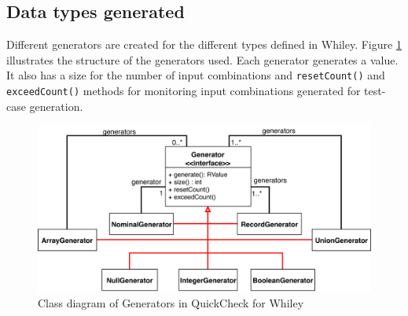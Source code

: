 \subsection{Data types generated}
Different generators are created for the different types defined in Whiley. 
Figure \ref{fig:qc-generators} illustrates the structure of the generators used.
Each generator generates a value. It also has a size for the number of input combinations and \texttt{resetCount()} and \texttt{exceedCount()} methods for monitoring input combinations generated for test-case generation.
 
\begin{figure}
	\caption{Class diagram of Generators in QuickCheck for Whiley}
	\label{fig:qc-generators}
	\includegraphics[width=\textwidth]{qc-generators}
	\centering
\end{figure}

